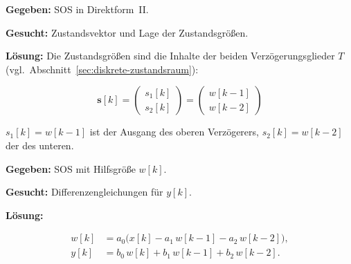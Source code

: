 \begin{beispiel}[6.8a) Zustandsvektor]

\textbf{Gegeben:} SOS in Direktform~II.

\textbf{Gesucht:} Zustandsvektor und Lage der Zustandsgrößen.

\textbf{Lösung:} Die Zustandsgrößen sind die Inhalte der beiden
Verzögerungsglieder $T$ (vgl.\ Abschnitt~\ref{sec:diskrete-zustandsraum}):

$$
\boxed{\;
\mathbf{s}[k]=\begin{pmatrix} s_1[k]\\ s_2[k]\end{pmatrix}
             =\begin{pmatrix} w[k-1]\\ w[k-2]\end{pmatrix}
\;}
$$

$s_1[k]=w[k-1]$ ist der Ausgang des oberen Verzögerers, $s_2[k]=w[k-2]$ der
des unteren.

\end{beispiel}

\begin{beispiel}

\textbf{Gegeben:} SOS mit Hilfsgröße $w[k]$.

\textbf{Gesucht:} Differenzengleichungen für $y[k]$.

\textbf{Lösung:}

$$
\boxed{\;
\begin{aligned}
w[k] &= a_0\bigl(x[k]-a_1\,w[k-1]-a_2\,w[k-2]\bigr),\\
y[k] &= b_0\,w[k]+b_1\,w[k-1]+b_2\,w[k-2].
\end{aligned}
\;}
$$

\end{beispiel}

